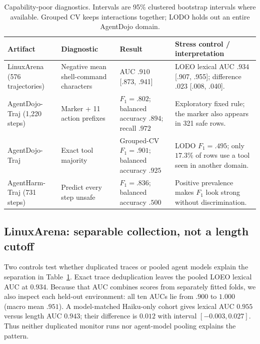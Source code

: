 \documentclass{article}
\newcommand{\ci}[2]{[#1, #2]}
\begin{document}
\begin{table}[t]
\caption{Capability-poor diagnostics.  Intervals are 95\% clustered bootstrap
intervals where available.  Grouped CV keeps interactions together; LODO holds out
an entire AgentDojo domain.}
\label{tab:diagnostics}
\centering
\small
\begin{tabularx}{\textwidth}{>{\raggedright\arraybackslash}p{2.45cm}
  >{\raggedright\arraybackslash}p{3.45cm}
  >{\raggedright\arraybackslash}p{3.45cm}>{\raggedright\arraybackslash}X}
\toprule
Artifact & Diagnostic & Result & Stress control / interpretation \\
\midrule
LinuxArena (576 trajectories) & Negative mean shell-command characters &
AUC $.910$ \ci{.873}{.941} & LOEO lexical AUC $.934$
\ci{.907}{.955}; difference $.023$ \ci{.008}{.040}. \\
\addlinespace
AgentDojo-Traj (1,220 steps) & Marker + 11 action prefixes &
$F_1=.802$; balanced accuracy $.894$; recall $.972$ & Exploratory fixed rule;
the marker also appears in 321 safe rows. \\
\addlinespace
AgentDojo-Traj & Exact tool majority &
Grouped-CV $F_1=.901$; balanced accuracy $.925$ & LODO $F_1=.495$;
only $17.3\%$ of rows use a tool seen in another domain. \\
\addlinespace
AgentHarm-Traj (731 steps) & Predict every step unsafe &
$F_1=.836$; balanced accuracy $.500$ & Positive prevalence makes $F_1$
look strong without discrimination. \\
\bottomrule
\end{tabularx}
\end{table}

\subsection{LinuxArena: separable collection, not a length cutoff}

Two controls test whether duplicated traces or pooled agent models explain
the separation in Table~\ref{tab:diagnostics}. Exact trace deduplication
leaves the pooled LOEO lexical AUC at $0.934$.  Because that AUC combines scores
from separately fitted folds, we also inspect each held-out environment: all ten
AUCs lie from $.900$ to $1.000$ (macro mean $.951$).  A model-matched Haiku-only cohort gives
lexical AUC $0.955$ versus length AUC $0.943$; their difference is $0.012$ with
interval $[-0.003,0.027]$.  Thus neither duplicated monitor runs nor agent-model
pooling explains the pattern.
\end{document}
